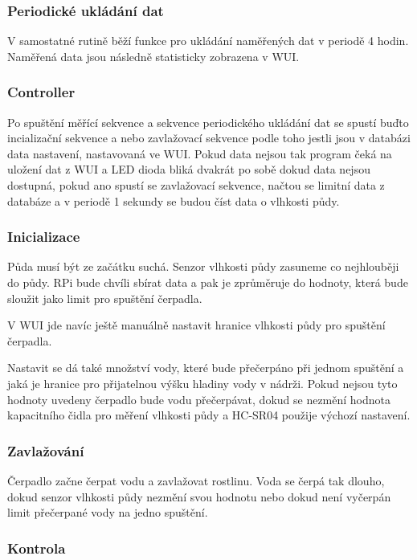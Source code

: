\documentclass[12pt,a4paper]{article}
\begin{document}
\subsubsection{Periodické ukládání dat}

V samostatné rutině běží funkce pro ukládání naměřených dat v periodě 4 hodin.
Naměřená data jsou následně statisticky zobrazena v \ac{WUI}.

\subsubsection{Controller}

Po spuštění měřící sekvence a sekvence periodického ukládání dat se spustí
buďto incializační sekvence a nebo zavlažovací sekvence podle toho jestli jsou
v databázi data nastavení, nastavovaná ve \ac{WUI}. Pokud data nejsou tak
program
čeká na uložení dat z \ac{WUI} a \ac{LED} dioda bliká dvakrát po sobě dokud
data
nejsou
dostupná, pokud ano spustí se zavlažovací sekvence, načtou se limitní data z
databáze a v periodě 1 sekundy se budou číst data o vlhkosti půdy.

\subsubsection{Inicializace}

Půda musí být ze začátku suchá. Senzor vlhkosti půdy zasuneme co nejhlouběji do
půdy. \ac{RPi} bude chvíli sbírat data a pak je zprůměruje do hodnoty, která
bude
sloužit jako limit pro spuštění čerpadla.

V \ac{WUI} jde navíc ještě manuálně nastavit hranice vlhkosti půdy pro spuštění
čerpadla.

Nastavit se dá také množství vody, které bude přečerpáno při jednom spuštění a
jaká je hranice pro přijatelnou výšku hladiny vody v nádrži. Pokud nejsou tyto
hodnoty uvedeny čerpadlo bude vodu přečerpávat, dokud se nezmění hodnota
kapacitního čidla pro měření vlhkosti půdy a \ac{HC-SR04} použije výchozí
nastavení.

\subsubsection{Zavlažování}

Čerpadlo začne čerpat vodu a zavlažovat rostlinu. Voda se čerpá tak dlouho,
dokud senzor vlhkosti půdy nezmění svou hodnotu nebo dokud není vyčerpán limit
přečerpané vody na jedno spuštění.

\subsubsection{Kontrola}
\end{document}
